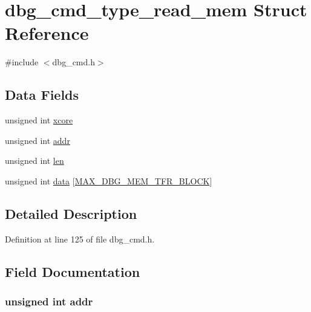 \hypertarget{structdbg__cmd__type__read__mem}{\section{dbg\-\_\-cmd\-\_\-type\-\_\-read\-\_\-mem Struct Reference}
\label{structdbg__cmd__type__read__mem}
}


{\ttfamily \#include $<$dbg\-\_\-cmd.\-h$>$}

\subsection*{Data Fields}
\begin{DoxyCompactItemize}
\item 
unsigned int \hyperlink{structdbg__cmd__type__read__mem_a78357326dd562d441c3c73f5676ac638}{xcore}
\item 
unsigned int \hyperlink{structdbg__cmd__type__read__mem_ab36863a07751ac73459d46b677c33b57}{addr}
\item 
unsigned int \hyperlink{structdbg__cmd__type__read__mem_a77124bd5f7e31e6fffc19f335da0c23f}{len}
\item 
unsigned int \hyperlink{structdbg__cmd__type__read__mem_ab8207ec1023efdcd4c92b045fd4d2dd0}{data} \mbox{[}\hyperlink{dbg__cmd_8h_ab7ab991376fede9d59ab9bcacd534801}{M\-A\-X\-\_\-\-D\-B\-G\-\_\-\-M\-E\-M\-\_\-\-T\-F\-R\-\_\-\-B\-L\-O\-C\-K}\mbox{]}
\end{DoxyCompactItemize}


\subsection{Detailed Description}


Definition at line 125 of file dbg\-\_\-cmd.\-h.



\subsection{Field Documentation}
\hypertarget{structdbg__cmd__type__read__mem_ab36863a07751ac73459d46b677c33b57}{
\subsubsection[{addr}]{\setlength{\rightskip}{0pt plus 5cm}unsigned int addr}}\label{structdbg__cmd__type__read__mem_ab36863a07751ac73459d46b677c33b57}


